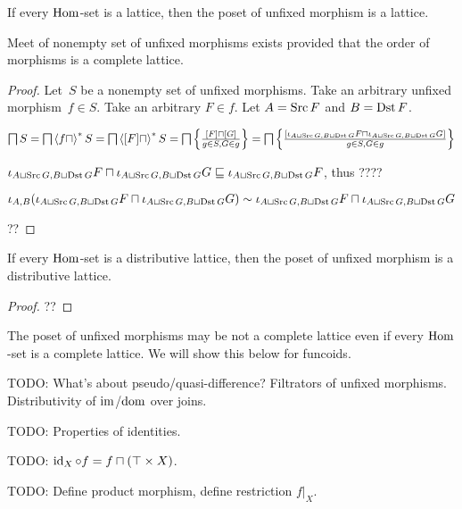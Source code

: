 \begin{cor}
If every $\operatorname{Hom}$-set is a lattice, then
the poset of unfixed morphism is a lattice.
\end{cor}

\begin{thm}
Meet of nonempty set of unfixed morphisms
exists provided that the order of morphisms is
a complete lattice.
\end{thm}

\begin{proof}
Let~$S$ be a nonempty set of unfixed morphisms. Take
an arbitrary unfixed morphism~$f\in S$. Take an
arbitrary $F\in f$. Let $A=\operatorname{Src} F$ and $B=\operatorname{Dst} F$.

$\bigsqcap S=\bigsqcap\left\langle f\sqcap\right\rangle ^{\ast}S=
\bigsqcap\left\langle [F]\sqcap\right\rangle ^{\ast}S=
\bigsqcap\left\{ \frac{[F]\sqcap[G]}{g\in S,G\in g}\right\}=
\bigsqcap\left\{ \frac{[\iota_{A\sqcup\operatorname{Src} G,B\sqcup\operatorname{Dst} G}F\sqcap\iota_{A\sqcup\operatorname{Src} G,B\sqcup\operatorname{Dst} G}G]}{g\in S,G\in g}\right\}$

$\iota_{A\sqcup\operatorname{Src} G,B\sqcup\operatorname{Dst} G}F\sqcap\iota_{A\sqcup\operatorname{Src} G,B\sqcup\operatorname{Dst} G}G\sqsubseteq
\iota_{A\sqcup\operatorname{Src} G,B\sqcup\operatorname{Dst} G}F$, thus ????

$\iota_{A,B}(\iota_{A\sqcup\operatorname{Src} G,B\sqcup\operatorname{Dst} G}F\sqcap\iota_{A\sqcup\operatorname{Src} G,B\sqcup\operatorname{Dst} G}G) \sim
\iota_{A\sqcup\operatorname{Src} G,B\sqcup\operatorname{Dst} G}F\sqcap\iota_{A\sqcup\operatorname{Src} G,B\sqcup\operatorname{Dst} G}G$

??
\end{proof}

\begin{prop}
If every $\operatorname{Hom}$-set is a distributive lattice, then
the poset of unfixed morphism is a distributive lattice.
\end{prop}

\begin{proof}
??
\end{proof}

The poset of unfixed morphisms may be not a complete
lattice even if every $\operatorname{Hom}$-set is a complete lattice.
We will show this below for funcoids.

TODO:
What's about pseudo/quasi-difference? Filtrators of unfixed morphisms.
Distributivity of $\operatorname{im}$/$\operatorname{dom}$ over joins.

TODO: Properties of identities.

TODO: $\operatorname{id}_X\circ f=f\sqcap(\top\times X)$.

TODO: Define product morphism, define restriction $f|_X$.

